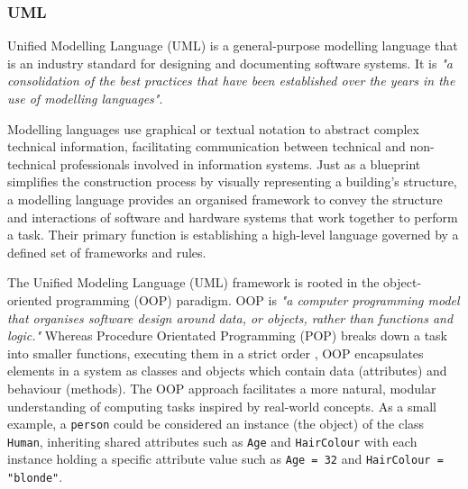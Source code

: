 \documentclass{article}
\begin{document}
{\subsubsection{UML}

Unified Modelling Language (UML) is a general-purpose modelling language that is an industry standard for designing and documenting software systems. It is \textit{"a consolidation of the best practices that have been established over the years in the use of modelling languages"}\cite{Seidl_Scholz_Huemer_Kappel_Duffy_2014}.

Modelling languages use graphical or textual notation to abstract complex technical information, facilitating communication between technical and non-technical professionals involved in information systems. Just as a blueprint simplifies the construction process by visually representing a building’s structure, a modelling language provides an organised framework to convey the structure and interactions of software and hardware systems that work together to perform a task\cite{Seidl_Scholz_Huemer_Kappel_Duffy_2014}. Their primary function is establishing a high-level language governed by a defined set of frameworks and rules\cite{Modelinglanguagemean}.

The Unified Modeling Language (UML) framework is rooted in the object-oriented programming (OOP) paradigm. OOP is \textit{"a computer programming model that organises software design around data, or objects, rather than functions and logic."}\cite{TechTargetOOP} Whereas Procedure Orientated Programming (POP) breaks down a task into smaller functions, executing them in a strict order \cite{OOPPOP}, OOP encapsulates elements in a system as classes and objects which contain data (attributes) and behaviour (methods)\cite{MediumOOPPOP}. The OOP approach facilitates a more natural, modular understanding of computing tasks inspired by real-world concepts\cite{Seidl_Scholz_Huemer_Kappel_Duffy_2014}. As a small example, a \texttt{person} could be considered an instance (the object) of the class \texttt{Human}, inheriting shared attributes such as \texttt{Age} and \texttt{HairColour} with each instance holding a specific attribute value such as \texttt{Age = 32} and \texttt{HairColour = "blonde"}.

}
\end{document}
